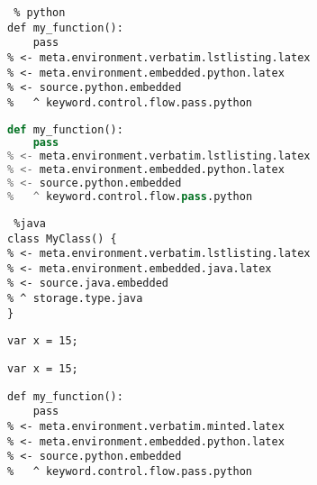 \documentclass[12pt]{article}
\begin{document}

\begin{lstlisting} % python
def my_function():
    pass
% <- meta.environment.verbatim.lstlisting.latex
% <- meta.environment.embedded.python.latex
% <- source.python.embedded
%   ^ keyword.control.flow.pass.python
\end{lstlisting}

\begin{lstlisting}[frame=single,
                   language=python] %python
def my_function():
    pass
% <- meta.environment.verbatim.lstlisting.latex
% <- meta.environment.embedded.python.latex
% <- source.python.embedded
%   ^ keyword.control.flow.pass.python
\end{lstlisting}

\begin{lstlisting} %java
class MyClass() {
% <- meta.environment.verbatim.lstlisting.latex
% <- meta.environment.embedded.java.latex
% <- source.java.embedded
% ^ storage.type.java
}
\end{lstlisting}

\lstinline{var x = 15;}

\lstinline|var x = 15;|



\begin{verbatim}
def my_function():
    pass
% <- meta.environment.verbatim.minted.latex
% <- meta.environment.embedded.python.latex
% <- source.python.embedded
%   ^ keyword.control.flow.pass.python
\end{verbatim}


\end{document}
